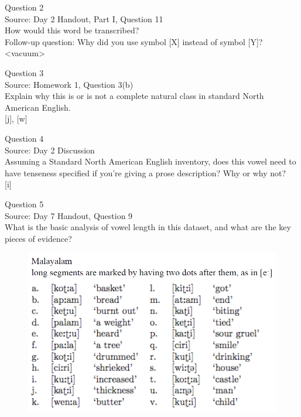 \documentclass[12pt]{article}
\begin{document}
\newpage

{\large Question 2}\\

Source: Day 2 Handout, Part I, Question 11\\

How would this word be transcribed?\\ Follow-up question: Why did you use symbol [X] instead of symbol [Y]?\\

<vacuum>


\newpage

{\large Question 3}\\

Source: Homework 1, Question 3(b)\\

Explain why this is or is not a complete natural class in standard North American English.\\

{[j]}, {[w]}


\newpage

{\large Question 4}\\

Source: Day 2 Discussion\\

Assuming a Standard North American English inventory, does this vowel need to have tenseness specified if you're giving a prose description? Why or why not?\\

{[i]}


\newpage

{\large Question 5}\\

Source: Day 7 Handout, Question 9\\

What is the basic analysis of vowel length in this dataset, and what are the key pieces of evidence?\\

\begin{figure}[H]
\includegraphics{../images/malayalam.png}
\end{figure}
\end{document}
